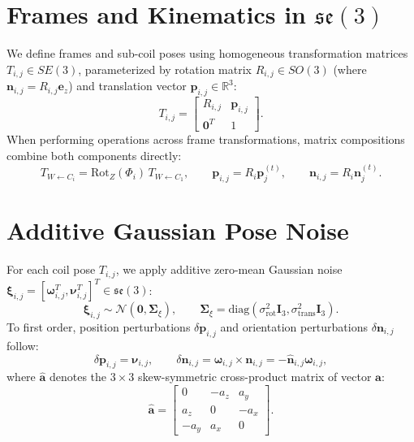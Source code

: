 \documentclass[11pt, a4paper]{article}
\begin{document}
\section{Frames and Kinematics in $\mathfrak{se}(3)$}
We define frames and sub-coil poses using homogeneous transformation matrices $T_{i,j} \in SE(3)$, parameterized by rotation matrix $R_{i,j} \in SO(3)$ (where $\mathbf{n}_{i,j} = R_{i,j} \mathbf{e}_z$) and translation vector $\mathbf{p}_{i,j} \in \mathbb{R}^3$:
\begin{equation}
    T_{i,j} = \begin{bmatrix} R_{i,j} & \mathbf{p}_{i,j} \\ \mathbf{0}^T & 1 \end{bmatrix}.
\end{equation}
When performing operations across frame transformations, matrix compositions combine both components directly:
\begin{equation}
    T_{W \gets C_i} = \mathrm{Rot}_Z(\Phi_i) \, T_{W \gets C_1}, \qquad \mathbf{p}_{i,j} = R_i \mathbf{p}^{(t)}_j, \qquad \mathbf{n}_{i,j} = R_i \mathbf{n}^{(t)}_j.
\end{equation}

\section{Additive Gaussian Pose Noise}
For each coil pose $T_{i,j}$, we apply additive zero-mean Gaussian noise $\boldsymbol{\xi}_{i,j} = [\boldsymbol{\omega}_{i,j}^T, \boldsymbol{\nu}_{i,j}^T]^T \in \mathfrak{se}(3)$:
\begin{equation}
    \boldsymbol{\xi}_{i,j} \sim \mathcal{N}(\mathbf{0}, \boldsymbol{\Sigma}_{\xi}), \qquad \boldsymbol{\Sigma}_{\xi} = \text{diag}(\sigma_{\text{rot}}^2 \mathbf{I}_3, \sigma_{\text{trans}}^2 \mathbf{I}_3).
\end{equation}
To first order, position perturbations $\delta \mathbf{p}_{i,j}$ and orientation perturbations $\delta \mathbf{n}_{i,j}$ follow:
\begin{equation}
    \delta \mathbf{p}_{i,j} = \boldsymbol{\nu}_{i,j}, \qquad \delta \mathbf{n}_{i,j} = \boldsymbol{\omega}_{i,j} \times \mathbf{n}_{i,j} = -\hat{\mathbf{n}}_{i,j} \boldsymbol{\omega}_{i,j},
\end{equation}
where $\hat{\mathbf{a}}$ denotes the $3 \times 3$ skew-symmetric cross-product matrix of vector $\mathbf{a}$:
\begin{equation}
    \hat{\mathbf{a}} = \begin{bmatrix} 0 & -a_z & a_y \\ a_z & 0 & -a_x \\ -a_y & a_x & 0 \end{bmatrix}.
\end{equation}
\end{document}
